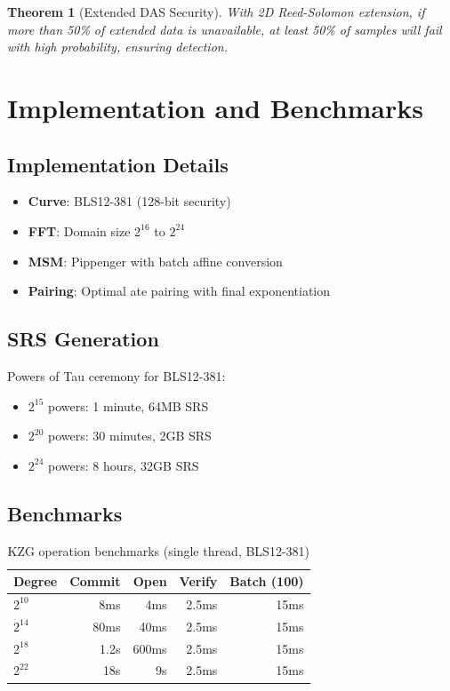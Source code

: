 \documentclass[11pt,a4paper]{article}
\newtheorem{theorem}{Theorem}[section]
\begin{document}
\begin{theorem}[Extended DAS Security]
With 2D Reed-Solomon extension, if more than 50\% of extended data is unavailable, at least 50\% of samples will fail with high probability, ensuring detection.
\end{theorem}

\section{Implementation and Benchmarks}
\label{sec:implementation}

\subsection{Implementation Details}

\begin{itemize}
    \item \textbf{Curve}: BLS12-381 (128-bit security)
    \item \textbf{FFT}: Domain size $2^{16}$ to $2^{24}$
    \item \textbf{MSM}: Pippenger with batch affine conversion
    \item \textbf{Pairing}: Optimal ate pairing with final exponentiation
\end{itemize}

\subsection{SRS Generation}

Powers of Tau ceremony for BLS12-381:
\begin{itemize}
    \item $2^{15}$ powers: 1 minute, 64MB SRS
    \item $2^{20}$ powers: 30 minutes, 2GB SRS
    \item $2^{24}$ powers: 8 hours, 32GB SRS
\end{itemize}

\subsection{Benchmarks}

\begin{table}[h]
\centering
\begin{tabular}{lrrrr}
\toprule
\textbf{Degree} & \textbf{Commit} & \textbf{Open} & \textbf{Verify} & \textbf{Batch (100)} \\
\midrule
$2^{10}$ & 8ms & 4ms & 2.5ms & 15ms \\
$2^{14}$ & 80ms & 40ms & 2.5ms & 15ms \\
$2^{18}$ & 1.2s & 600ms & 2.5ms & 15ms \\
$2^{22}$ & 18s & 9s & 2.5ms & 15ms \\
\bottomrule
\end{tabular}
\caption{KZG operation benchmarks (single thread, BLS12-381)}
\label{tab:kzg-bench}
\end{table}
\end{document}
